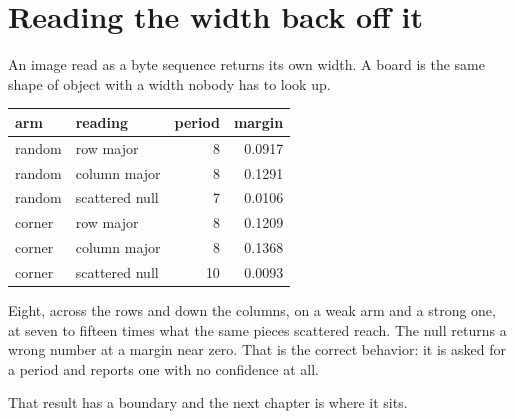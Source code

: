 \section{Reading the width back off it}

An image read as a byte sequence returns its own width. A board is the same
shape of object with a width nobody has to look up.

\begin{center}
\begin{tabular}{@{}llrr@{}}
\toprule
arm & reading & period & margin \\
\midrule
random & row major & 8 & 0.0917 \\
random & column major & 8 & 0.1291 \\
random & scattered null & 7 & 0.0106 \\
corner & row major & 8 & 0.1209 \\
corner & column major & 8 & 0.1368 \\
corner & scattered null & 10 & 0.0093 \\
\bottomrule
\end{tabular}
\end{center}

Eight, across the rows and down the columns, on a weak arm and a strong one, at seven to fifteen
times what the same pieces scattered reach. The null returns a wrong number at a margin near zero.
That is the correct behavior: it is asked for a period and reports one with no confidence at all.

That result has a boundary and the next chapter is where it sits.
